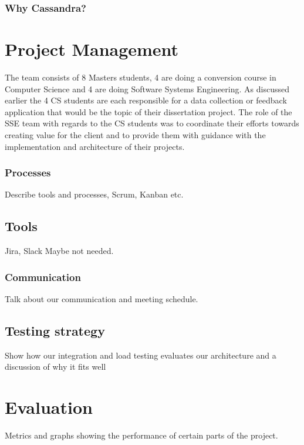 \documentclass[prodmode,acmtosem]{acmsmall} %
\begin{document}
\subsubsection{Why Cassandra?}



\section{Project Management}
The team consists of 8 Masters students, 4 are doing a conversion course in Computer Science and 4 are doing Software Systems Engineering. As discussed earlier the 4 CS students are each responsible for a data collection or feedback application that would be the topic of their dissertation project.
The role of the SSE team with regards to the CS students was to coordinate their efforts towards creating value for the client and to provide them with guidance with the implementation and architecture of their projects.

\subsubsection{Processes}
Describe tools and processes, Scrum, Kanban etc.

\subsection{Tools}
Jira, Slack Maybe not needed.

\subsubsection{Communication}
Talk about our communication and meeting schedule.

\subsection{Testing strategy}
Show how our integration and load testing evaluates our architecture and a discussion of why it fits well

\section{Evaluation}
Metrics and graphs showing the performance of certain parts of the project.
\end{document}
